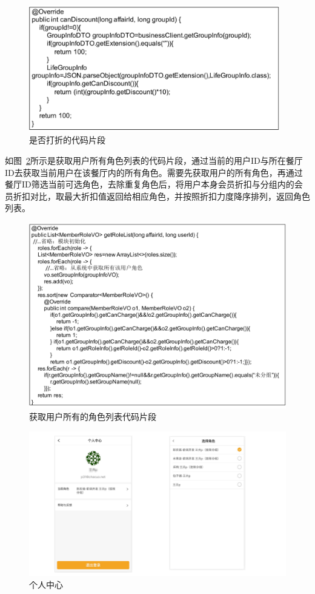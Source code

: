 \begin{figure}[htbp!]
    \centering
    \includegraphics[width=4.3in]{FIGs/chapter4/4.pdf}
    \caption{是否打折的代码片段}\label{fig_user_4}
\end{figure}

如图~\ref{fig_user_5}所示是获取用户所有角色列表的代码片段，通过当前的用户ID与所在餐厅ID去获取当前用户在该餐厅内的所有角色。需要先获取用户的所有角色，再通过餐厅ID筛选当前可选角色，去除重复角色后，将用户本身会员折扣与分组内的会员折扣对比，取最大折扣值返回给相应角色，并按照折扣力度降序排列，返回角色列表。

\begin{figure}[htbp!]
    \centering
    \includegraphics[width=5.3in]{FIGs/chapter4/5.pdf}
    \caption{获取用户所有的角色列表代码片段}\label{fig_user_5}
\end{figure}

\begin{figure}[htbp!]
    \centering
    \includegraphics[width=\linewidth]{FIGs/chapter4/user_role_view.pdf}
    \caption{个人中心}\label{fig_user_role_view}
\end{figure}


